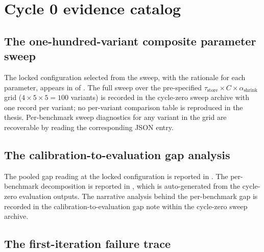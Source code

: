 
\chapter{Cycle 0 evidence catalog}
\label{app:cycle0-catalog}


\section{The one-hundred-variant composite parameter sweep}
\label{app:sweep-full}

The locked configuration selected from the sweep, with the rationale for each parameter, appears in  of . The full sweep over the pre-specified $\tau_{\text{store}} \times C \times \alpha_{\text{shrink}}$ grid ($4 \times 5 \times 5 = 100$ variants) is recorded in the cycle-zero sweep archive with one record per variant; no per-variant comparison table is reproduced in the thesis. Per-benchmark sweep diagnostics for any variant in the grid are recoverable by reading the corresponding JSON entry.

\section{The calibration-to-evaluation gap analysis}
\label{app:cal-eval-gap}

The pooled gap reading at the locked configuration is reported in . The per-benchmark decomposition is reported in , which is auto-generated from the cycle-zero evaluation outputs. The narrative analysis behind the per-benchmark gap is recorded in the calibration-to-evaluation gap note within the cycle-zero sweep archive.

\section{The first-iteration failure trace}
\label{app:first-iteration-trace}

